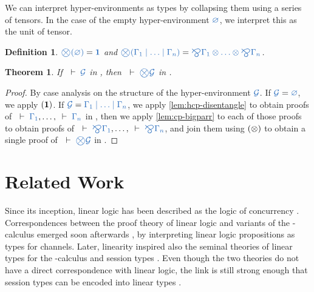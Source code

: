 \documentclass[draft,submission,copyright,creativecommons]{eptcs}
\newtheorem{definition}{Definition}
\newtheorem{theorem}{Theorem}
\begin{document}
We can interpret hyper-environments as types by collapsing them using a series
of tensors. In the case of the empty hyper-environment
$\ty{\emptyhypercontext}$, we interpret this as the unit of tensor.
\begin{definition}\label{def:bigtens}
  $\ty{\bigtens(\emptyhypercontext)} = \ty{\one}$
  and 
  $\ty{\bigtens(\Gamma_1 \hsep \dots \hsep \Gamma_n)} = \ty{\bigparr\Gamma_1 \tens \dots \tens \bigparr\Gamma_n}$.
\end{definition}

\begin{theorem}\label{thm:hcp2cp-bigtens}
  If $\seq{\mathcal{G}}$ in \hcp, then $\seq{\bigtens\mathcal{G}}$ in \cp.
\end{theorem}
\begin{proof}
  By case analysis on the structure of the hyper-environment $\ty{\mathcal{G}}$.
    If $\ty{\mathcal{G}} = \ty{\emptyhypercontext}$, we apply $(\mathbf{1})$.
    If $\ty{\mathcal{G}} = \ty{\Gamma_1 \hsep \dots \hsep \Gamma_n}$,
    we apply \cref{lem:hcp-disentangle} to obtain proofs of $\seq{\Gamma_1}, \dots,
    \seq{\Gamma_n}$ in \cp, then we apply \cref{lem:cp-bigparr} to each of
    those proofs to obtain proofs of $\seq{\bigparr\Gamma_1}, \dots,
    \seq{\bigparr\Gamma_n}$, and join them using $(\otimes)$ to obtain a single
    proof of $\seq{\bigtens\mathcal{G}}$ in \cp.
\end{proof}

\section{Related Work}
\label{sec:related-work}

Since its inception, linear logic has been described as the logic of
concurrency \cite{girard1987}.
Correspondences between the proof theory of linear logic and variants of the
\textpi-calculus emerged soon afterwards \cite{abramsky1994,bellin1994}, by
interpreting linear logic propositions as types for channels.
Later, linearity inspired also the seminal theories of linear types for the
\textpi-calculus \cite{kobayashi1999} and session types \cite{honda1998}.
Even though the two theories do not have a direct correspondence with linear
logic, the link is still strong enough that session types
can be encoded into linear types \cite{dardha2017}.
\end{document}
